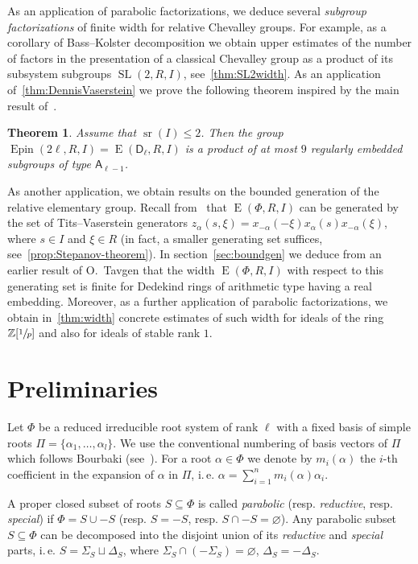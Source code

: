 \documentclass[11pt]{amsart}
\theoremstyle{plain}
\newtheorem{thm}{Theorem}
\numberwithin{equation}{section}
\numberwithin{lemma}{section}
\theoremstyle{definition}
\theoremstyle{remark}
\DeclareMathOperator{\SL}{SL}
\DeclareMathOperator{\E}{E}
\DeclareMathOperator{\sr}{sr}
\DeclareMathOperator{\Epin}{Epin}
\newcommand{\rA}{\mathsf{A}}
\newcommand{\rD}{\mathsf{D}}
\begin{document}
As an application of parabolic factorizations, we deduce several {\it subgroup factorizations} of finite width for relative Chevalley groups.
For example, as a corollary of Bass--Kolster decomposition we obtain upper estimates of the number of factors in the presentation of a classical Chevalley group
 as a product of its subsystem subgroups $\SL(2, R, I)$, see~\cref{thm:SL2width}.
As an application of~\cref{thm:DennisVaserstein} we prove the following theorem inspired by the main result of~\cite{Nik07}.
\begin{thm}\label{thm:spin-sln-prod} Assume that $\sr(I) \leqslant 2$. Then the group $\Epin(2\ell, R, I)=\E(\rD_\ell, R, I)$ is a product of at most $9$ regularly embedded subgroups of type $\rA_{\ell-1}$. \end{thm}
As another application, we obtain results on the bounded generation of the relative elementary group.
Recall from~\cite[Theorem~2]{Va86} that $\E(\Phi, R, I)$ can be generated by the set of Tits--Vaserstein generators
 $z_\alpha(s, \xi) =  x_{-\alpha}(-\xi) x_\alpha(s) x_{-\alpha}(\xi)$, where $s\in I$ and $\xi\in R$
(in fact, a smaller generating set suffices, see~\cref{prop:Stepanov-theorem}).
In section~\ref{sec:boundgen} we deduce from an earlier result of O.~Tavgen that the width $\E(\Phi, R, I)$ with respect to this generating set is
 finite for Dedekind rings of arithmetic type having a real embedding.
Moreover, as a further application of parabolic factorizations, we obtain in~\cref{thm:width} concrete estimates of such width
 for ideals of the ring $\mathbb{Z}[\sfrac{1}{p}]$ and also for ideals of stable rank $1$.
 

\section{Preliminaries}\label{sec:preliminaries}
Let $\Phi$ be a reduced irreducible root system of rank $\ell$ with a fixed basis of simple roots $\Pi=\{\alpha_1, \ldots, \alpha_l\}$.
We use the conventional numbering of basis vectors of $\Pi$ which follows Bourbaki (see~\cite[Table~1]{PSV98}).
For a root $\alpha\in\Phi$ we denote by $m_i(\alpha)$ the $i$-th coefficient in the expansion of $\alpha$ in $\Pi$,
 i.\,e. $\alpha = \sum_{i=1}^n m_i(\alpha) \alpha_i$.

A proper closed subset of roots $S\subseteq \Phi$ is called {\it parabolic} (resp. {\it reductive}, resp. {\it special}) if $\Phi=S \cup -S$ (resp. $S = -S$, resp. $S \cap -S=\varnothing$).
Any parabolic subset $S \subseteq \Phi$ can be decomposed into the disjoint union of its \emph{reductive} and \emph{special} parts, i.\,e. 
$S = \Sigma_S \sqcup \Delta_S$, where $\Sigma_S \cap (-\Sigma_S) = \varnothing$, $\Delta_S = -\Delta_S$.
\end{document}
